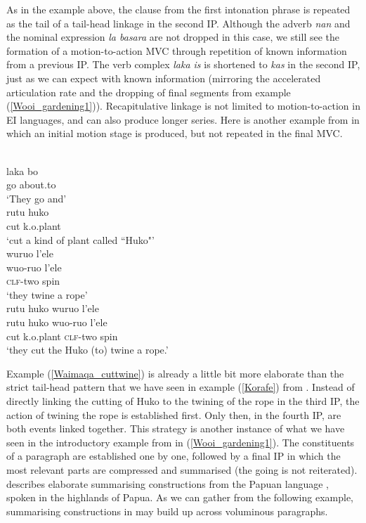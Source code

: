As in the  example above, the clause from the first intonation phrase is repeated as the tail of a tail-head linkage in the second IP. Although the adverb \textit{nan} and the nominal expression \textit{la basara} are not dropped in this case, we still see the formation of a motion-to-action MVC through repetition of known information from a previous IP. The verb complex \textit{laka is} is shortened to \textit{kas} in the second IP, just as we can expect with known information (mirroring the accelerated articulation rate and the dropping of final segments from example (\ref{Wooi_gardening1})). Recapitulative linkage is not limited to motion-to-action in EI languages, and can also produce longer series. Here is another example from  in which an initial motion stage is produced, but not repeated in the final MVC.

\ea \label{Waimaqa_cuttwine}
\\
\ea
\gll laka bo \\
go about.to \\
\glft `They go and' \\
\ex
\gll rutu huko \\
cut k.o.plant \\
\glft `cut a kind of plant called ``Huko"' \\
\ex
\glll wuruo l'ele \\
wuo-ruo l'ele \\
\textsc{clf}-two spin \\
\glft `they twine a rope' \\
\ex
\glll rutu huko wuruo l'ele \\
rutu huko wuo-ruo l'ele \\
cut k.o.plant \textsc{clf}-two spin \\
\glft `they cut the Huko (to) twine a rope.'\\
\z
\z

Example (\ref{Waimaqa_cuttwine}) is already a little bit more elaborate than the strict tail-head pattern that we have seen in example (\ref{Korafe}) from . Instead of directly linking the cutting of Huko to the twining of the rope in the third IP, the action of twining the rope is established first. Only then, in the fourth IP, are both events linked together. This strategy is another instance of what we have seen in the introductory example from  in (\ref{Wooi_gardening1}). The constituents of a paragraph are established one by one, followed by a final IP in which the most relevant parts are compressed and summarised (the going is not reiterated). \citet{heeschen1998eipo} describes elaborate summarising constructions from the Papuan language , spoken in the highlands of  Papua. As we can gather from the following example, summarising constructions in  may build up across voluminous paragraphs.

